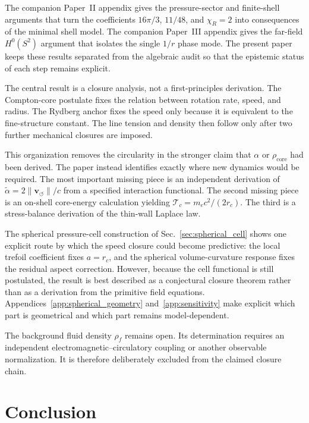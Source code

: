 \documentclass[aps,pra,preprint,longbibliography,nofootinbib]{revtex4-2}
\newcommand{\vnorm}{\lVert\mathbf{v}_{\!\boldsymbol{\circlearrowleft}}\rVert} %
\newcommand{\rhof}{\rho_{\!f}}                   %
\begin{document}
The companion Paper~II appendix gives the pressure-sector and finite-shell
arguments that turn the coefficients \(16\pi/3\), \(11/48\), and
\(\chi_R=2\) into consequences of the minimal shell model.  The companion
Paper~III appendix gives the far-field \(H^0(S^2)\) argument that isolates the
single \(1/r\) phase mode.  The present paper keeps these results separated from
the algebraic audit so that the epistemic status of each step remains explicit.

\label{sec:discussion}

The central result is a closure analysis, not a first-principles
derivation.  The Compton-core postulate fixes the relation between
rotation rate, speed, and radius.  The Rydberg anchor fixes the speed
only because it is equivalent to the fine-structure constant.  The line
tension and density then follow only after two further mechanical
closures are imposed.

This organization removes the circularity in the stronger claim that
$\alpha$ or $\rho_{\mathrm{core}}$ had been derived.  The paper instead
identifies exactly where new dynamics would be required.  The most
important missing piece is an independent derivation of
$\tilde\alpha=2\vnorm/c$ from a specified interaction functional.  The
second missing piece is an on-shell core-energy calculation yielding
$\mathcal{T}_c=m_ec^2/(2r_c)$.  The third is a stress-balance derivation
of the thin-wall Laplace law.

The spherical pressure-cell construction of Sec.~\ref{sec:spherical_cell}
shows one explicit route by which the speed closure could become
predictive: the local trefoil coefficient fixes $a=r_c$, and the
spherical volume-curvature response fixes the residual aspect correction.
However, because the cell functional is still postulated, the result is
best described as a conjectural closure theorem rather than as a derivation
from the primitive field equations.  Appendices~\ref{app:spherical_geometry}
and~\ref{app:sensitivity} make explicit which part is geometrical and which
part remains model-dependent.

The background fluid density $\rhof$ remains open.  Its determination
requires an independent electromagnetic--circulatory coupling or another
observable normalization.  It is therefore deliberately excluded from
the claimed closure chain.

\section{Conclusion}
\label{sec:conclusion}
\end{document}
